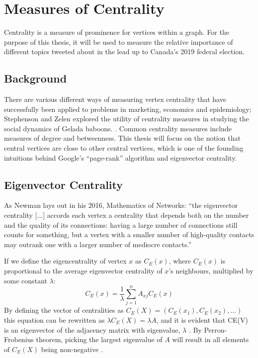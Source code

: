 	
\section{Measures of Centrality}

Centrality is a measure of prominence for vertices within a graph. For the
purpose of this thesis, it will be used to measure the relative importance of
different topics tweeted about in the lead up to Canada's 2019 federal election.

    
\subsection{Background}\label{sec:CentralityBackground}

There are various different ways of measuring vertex centrality that have
successfully been applied to problems in marketing, economics and epidemiology;
Stephenson and Zelen explored the utility of centrality measures in studying the
social dynamics of Gelada baboons. \cite{stephenson1989rethinking}. Common
centrality measures include measures of degree and betweenness. This thesis will
focus on the notion that central vertices are close to other central vertices,
which is one of the founding intuitions behind Google’s “page-rank” algorithm
and eigenvector centrality. 

	
\subsection{Eigenvector Centrality}\label{sec:EigCentrality}

As Newman lays out in his 2016, Mathematics of Networks: ``the eigenvector
centrality [...] accords each vertex a centrality that depends both on the
number and the quality of its connections: having a large number of connections
still counts for something, but a vertex with a smaller number of high-quality
contacts may outrank one with a larger number of mediocre contacts.'' \cite{newman2008mathematics}

If we define the eigencentrality of vertex $x$ as $C_{E}(x)$, where $C_{E}(x)$
is proportional to the average eigenvector centrality of $x$'s neighbours,
multiplied by some constant $\lambda$:
\begin{equation}
    C_{E}(x)=\frac{1}{\lambda}\sum_{j=1}^{n}A_{xj}C_{E}(x)
\end{equation}
By defining the vector of centralities as $C_E(X) = (C_E(x_1),C_E(x_2),...)$
this equation can be rewritten as $\lambda C_E(X) = \lambda A$, and it is
evident that CE(V) is an eigenvector of the adjacency matrix with eigenvalue, $\lambda$
\cite{newman2008mathematics}. By Perron-Frobenius theorem, picking the largest eigenvalue of $A$ will
result in all elements of $C_E(X)$ being non-negative \cite{newman2008mathematics}.